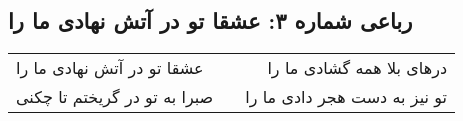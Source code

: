 \begin{center}
\section*{رباعی شماره ۳: عشقا تو در آتش نهادی ما را}
\label{sec:sh003}
\begin{longtable}{l p{0.5cm} r}
عشقا تو در آتش نهادی ما را
&&
درهای بلا همه گشادی ما را
\\
صبرا به تو در گریختم تا چکنی
&&
تو نیز به دست هجر دادی ما را
\\
\end{longtable}
\end{center}
